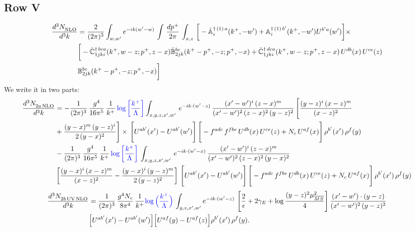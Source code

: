 \documentclass[9pt]{article}
\def\mf#1{\mathbb{#1}}
\numberwithin{equation}{section}
\begin{document}
\subsection{Row V}
\begin{align}
    \frac{d^{3}N_{\rm NLO}^{\rm}}{d^{3}k}  & = \frac{2}{(2\pi)^{3}}  \int_{w, w^\prime} e^{-ik(w^\prime-w)}\, \int\, \frac{dp^{+}}{2\pi}\,\int_{x,z}\, \bigg[-\bar{\mf{A}}^{\dagger\,(1)\,a}_{i}(k^{+},-w^{\prime})+\mf{A}^{\dagger\, (1)\, b^{\prime}}_{i}(k^{+},-w^{\prime})U^{b^{\prime}a}(w^{\prime})\bigg]\times\notag \\ & \bigg[-\Bar{\mf{C}}^{\dagger\, bca}_{1jki}(k^{+},w-z;p^{+},z-x)\Bar{\mf{B}}^{bc}_{2jk}(k^{+}-p^{+},- z;p^{+},-x)+\bar{\mf{C}}^{\dagger\, dca}_{1jki}(k^+,w-z; p^+, z-x)\,U^{db}(x)\,U^{ce}(z) \notag \\ & {\mf{B}}^{be}_{2jk} (k^{+}-p^+, -z; p^+, -x) \bigg]\nonumber
\end{align}
We write it in two parts: 
\begin{align}
    \frac{d^{3}N_{2a\,\rm NLO}^{\rm}}{d^{3}k}  & =   - \frac{1}{(2\pi)^{3}}\, \frac{g^{4}}{16\pi^{5}}\,\frac{1}{k^{+}}\,{\color{blue}\log{\left[\frac{k^{+}}{\Lambda}\right]}} \int_{x,y,z,x',w'}\, e^{-ik\cdot(w'-z)}\,\frac{(x'-w')^{i}\,(z-x)^{m}}{(x'-w')^{2}\,(z-x)^{2}\, (y-z)^{2}}\,\Bigg[\frac{(y-z)^{i}\,(x-z)^{m}}{(x-z)^{2}}\notag \\ & +\frac{(y-x)^{m}\,(y-z)^{i}}{2\,(y-x)^{2}}\Bigg]\times\, \Bigg[U^{ab'}(x')-U^{ab'}(w')\Bigg]\,\Bigg[-f^{adc}\,f^{fbe}\,U^{db}(x)\,U^{ce}(z)+N_{c}\,U^{af}(x)\Bigg]\,\rho^{b'}(x')\,\rho^{f}(y)\notag \\ & - \frac{1}{(2\pi)^{3}}\, \frac{g^{4}}{16\pi^{5}}\,\frac{1}{k^{+}}\,{\color{blue}\log{\left[\frac{k^{+}}{\Lambda}\right]}}\, \int_{x,y,z,x',w'}\,e^{-ik\cdot(w'-x)}\,\frac{(x'-w')^{i}\,(z-x)^{m}}{(x'-w')^{2}\,(z-x)^{2}\,(y-x)^{2}} \notag \\ &\left[\frac{(y-x)^{i}\,(x-z)^{m}}{(x-z)^{2}}-\frac{(y-x)^{i}\,(y-z)^{m}}{2\,(y-z)^{2}}\right]\, \Bigg[U^{ab'}(x')-U^{ab'}(w')\Bigg]\,\Bigg[-f^{adc}\,f^{fbe}\,U^{db}(x)\,U^{ce}(z)+N_{c}\,U^{af}(x)\Bigg]\,\rho^{b'}(x')\,\rho^{f}(y)
\end{align}
\begin{align}
\frac{d^{3}N_{2b\,\rm UV\, NLO}^{\rm}}{d^{3}k} & = \frac{1}{(2\pi)^{3}}\,\frac{g^{4}N_{c}}{8\pi^{4}}\,\frac{1}{k^{+}}
{\color{blue}\log\Big(\frac{k^{+}}{\Lambda}\Big)}\,\int_{y,z,x',w'}e^{-ik\cdot(w'-z)}\, \left[\frac{2}{\epsilon}+2\gamma_{E}+\log\frac{(y-z)^{2}\mu^{2}_{\overline{MS}}}{4}\right]
\frac{(x'-w')\cdot(y-z)}{(x'-w')^{2}\,(y-z)^{2}}\notag \\ &  \Big[U^{ab'}(x')-U^{ab'}(w')\Big]\Big[U^{af}(y)-U^{af}(z)\Big]\rho^{b'}(x')\,\rho^{f}(y).
\end{align}
\end{document}
